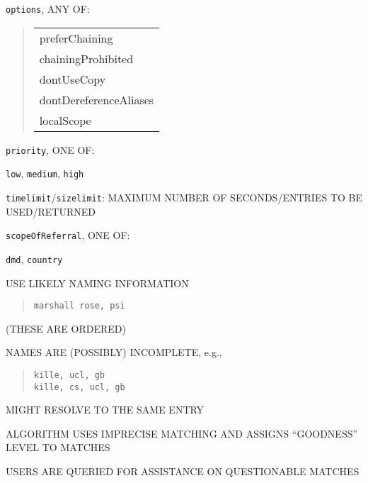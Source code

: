 \begin{bwslide}

\begin{nrtc}
\item \verb"options", ANY OF:
\begin{quote}\begin{tabular}{l}
preferChaining\\
chainingProhibited\\
dontUseCopy\\
dontDereferenceAliases\\
localScope
\end{tabular}\end{quote}

\item \verb"priority", ONE OF:
    \begin{nrtc}
    \item	\verb"low", \verb"medium", \verb"high"
    \end{nrtc}

\item \verb"timelimit"/\verb"sizelimit": MAXIMUM NUMBER OF SECONDS/ENTRIES TO
BE USED/RETURNED

\item \verb"scopeOfReferral", ONE OF:
    \begin{nrtc}
    \item	\verb"dmd", \verb"country"
    \end{nrtc}
\end{nrtc}
\end{bwslide}


\begin{bwslide}

\begin{nrtc}
\item	USE LIKELY NAMING INFORMATION
\begin{quote}\small\begin{verbatim}
marshall rose, psi
\end{verbatim}\end{quote}
	(THESE ARE ORDERED)

\item	NAMES ARE (POSSIBLY) INCOMPLETE, e.g.,
\begin{quote}\small\begin{verbatim}
kille, ucl, gb
kille, cs, ucl, gb
\end{verbatim}\end{quote}
	MIGHT RESOLVE TO THE SAME ENTRY

\item	ALGORITHM USES IMPRECISE MATCHING AND ASSIGNS ``GOODNESS'' LEVEL TO
	MATCHES

\item	USERS ARE QUERIED FOR ASSISTANCE ON QUESTIONABLE MATCHES
\end{nrtc}
\end{bwslide}


